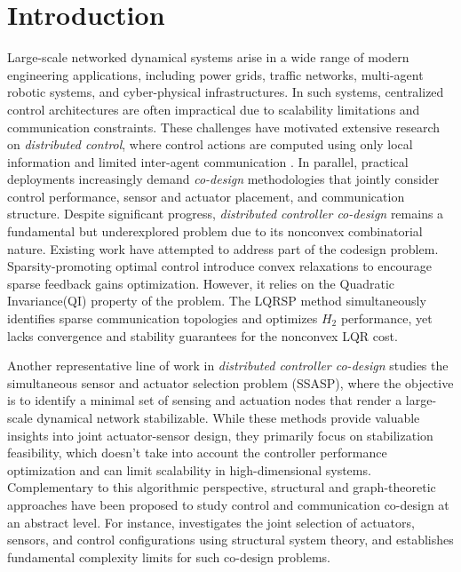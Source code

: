 \documentclass[conference]{IEEEtran}
\begin{document}
\section{Introduction}
Large-scale networked dynamical systems arise in a wide range of modern engineering applications, including power grids, traffic networks, multi-agent robotic systems, and cyber-physical infrastructures. In such systems, centralized control architectures are often impractical due to scalability limitations and communication constraints. These challenges have motivated extensive research on \emph{distributed control}, where control actions are computed using only local information and limited inter-agent communication \cite{9535262, anderson2019system, shin}. In parallel, practical deployments increasingly demand \emph{co-design} methodologies that jointly consider control performance, sensor and actuator placement, and communication structure. Despite significant progress, \emph{distributed controller co-design} remains a fundamental but underexplored problem due to its nonconvex combinatorial nature. Existing work have attempted to address part of the codesign problem\cite{pequito2015minimum}. Sparsity-promoting optimal control \cite{9535262} introduce convex relaxations to encourage sparse feedback gains optimization. However, it relies on the Quadratic Invariance(QI) property of the problem\cite{9535262}. The LQRSP \cite{lqrsp} method simultaneously identifies sparse communication topologies and optimizes $H_2$ performance, yet lacks convergence and stability guarantees for the nonconvex LQR cost. 

 Another representative line of work in \emph{distributed controller co-design} studies the simultaneous sensor and actuator selection problem (SSASP)\cite{Nugroho2019Automatica}, where the objective is to identify a minimal set of sensing and actuation nodes that render a large-scale dynamical network stabilizable. While these methods provide valuable insights into joint actuator-sensor design, they primarily focus on stabilization feasibility, which doesn't take into account the controller performance optimization and can limit scalability in high-dimensional systems. Complementary to this algorithmic perspective, structural and graph-theoretic approaches have been proposed to study control and communication co-design at an abstract level. For instance, \cite{Nugroho2019Automatica} investigates the joint selection of actuators, sensors, and control configurations using structural system theory, and establishes fundamental complexity limits for such co-design problems. 
 
\end{document}
